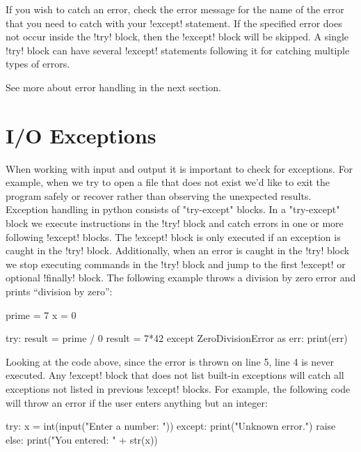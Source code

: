 \documentclass[11pt]{cselabheader}
\begin{document}
If you wish to catch an error, check the error message for the name of the error
that you need to catch with your \pythoninline!except! statement. If the
specified error does not occur inside the \pythoninline!try! block, then the
\pythoninline!except! block will be skipped. A single \pythoninline!try! block
can have several \pythoninline!except! statements following it for catching
multiple types of errors.

See more about error handling in the next section.

\pagebreak
\section{I/O Exceptions}
When working with input and output it is important to check for exceptions.  For
example, when we try to open a file that does not exist we'd like to exit the
program safely or recover rather than observing the unexpected results.
Exception handling in python consists of "try-except" blocks.  In a "try-except"
block we execute instructions in the \pythoninline!try! block and catch errors
in one or more following \pythoninline!except! blocks.  The
\pythoninline!except! block is only executed if an exception is caught in the
\pythoninline!try! block.  Additionally, when an error is caught in the
\pythoninline!try! block we stop executing commands in the \pythoninline!try!
block and jump to the first \pythoninline!except! or optional
\pythoninline!finally! block.  The following example throws a division by zero
error and prints ``division by zero'':

\begin{python3code}
prime = 7
x = 0

try:
    result = prime / 0
    result = 7*42
except ZeroDivisionError as err:
    print(err)
\end{python3code}

Looking at the code above, since the error is thrown on line 5, line 4 is never
executed.  Any \pythoninline!except!  block that does not list built-in
exceptions will catch all exceptions not listed in previous
\pythoninline!except! blocks.  For example, the following code will throw an
error if the user enters anything but an integer:

\begin{python3code}
try:
    x = int(input("Enter a number: "))
except:
    print("Unknown error.")
    raise
else:
    print("You entered: " + str(x))
\end{python3code}
\end{document}
